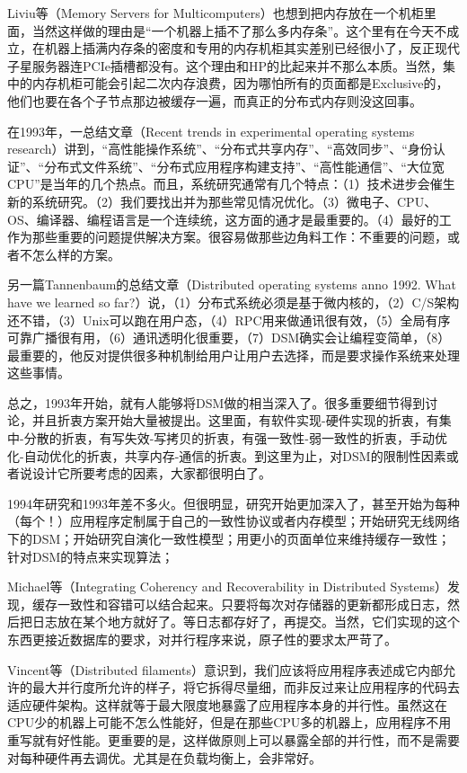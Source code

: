 \documentclass[a4paper,twoside]{scrbook}
\begin{document}
Liviu等（Memory Servers for Multicomputers）也想到把内存放在一个机柜里面，当然这样做的理由是“一个机器上插不了那么多内存条”。这个里有在今天不成立，在机器上插满内存条的密度和专用的内存机柜其实差别已经很小了，反正现代子星服务器连PCIe插槽都没有。这个理由和HP的比起来并不那么本质。当然，集中的内存机柜可能会引起二次内存浪费，因为哪怕所有的页面都是Exclusive的，他们也要在各个子节点那边被缓存一遍，而真正的分布式内存则没这回事。


在1993年，一总结文章（Recent trends in experimental operating systems research）讲到，“高性能操作系统”、“分布式共享内存”、“高效同步”、“身份认证”、“分布式文件系统”、“分布式应用程序构建支持”、“高性能通信”、“大位宽CPU”是当年的几个热点。而且，系统研究通常有几个特点：（1）技术进步会催生新的系统研究。（2）我们要找出并为那些常见情况优化。（3）微电子、CPU、OS、编译器、编程语言是一个连续统，这方面的通才是最重要的。（4）最好的工作为那些重要的问题提供解决方案。很容易做那些边角料工作：不重要的问题，或者不怎么样的方案。

另一篇Tannenbaum的总结文章（Distributed operating systems anno 1992. What have we learned so far?）说，（1）分布式系统必须是基于微内核的，（2）C/S架构还不错，（3）Unix可以跑在用户态，（4）RPC用来做通讯很有效，（5）全局有序可靠广播很有用，（6）通讯透明化很重要，（7）DSM确实会让编程变简单，（8）最重要的，他反对提供很多种机制给用户让用户去选择，而是要求操作系统来处理这些事情。

总之，1993年开始，就有人能够将DSM做的相当深入了。很多重要细节得到讨论，并且折衷方案开始大量被提出。这里面，有软件实现-硬件实现的折衷，有集中-分散的折衷，有写失效-写拷贝的折衷，有强一致性-弱一致性的折衷，手动优化-自动优化的折衷，共享内存-通信的折衷。到这里为止，对DSM的限制性因素或者说设计它所要考虑的因素，大家都很明白了。


1994年研究和1993年差不多火。但很明显，研究开始更加深入了，甚至开始为每种（每个！）应用程序定制属于自己的一致性协议或者内存模型；开始研究无线网络下的DSM；开始研究自演化一致性模型；用更小的页面单位来维持缓存一致性；针对DSM的特点来实现算法；

Michael等（Integrating Coherency and Recoverability in Distributed Systems）发现，缓存一致性和容错可以结合起来。只要将每次对存储器的更新都形成日志，然后把日志放在某个地方就好了。等日志都存好了，再提交。当然，它们实现的这个东西更接近数据库的要求，对并行程序来说，原子性的要求太严苛了。

Vincent等（Distributed filaments）意识到，我们应该将应用程序表述成它内部允许的最大并行度所允许的样子，将它拆得尽量细，而非反过来让应用程序的代码去适应硬件架构。这样就等于最大限度地暴露了应用程序本身的并行性。虽然这在CPU少的机器上可能不怎么性能好，但是在那些CPU多的机器上，应用程序不用重写就有好性能。更重要的是，这样做原则上可以暴露全部的并行性，而不是需要对每种硬件再去调优。尤其是在负载均衡上，会非常好。
\end{document}
